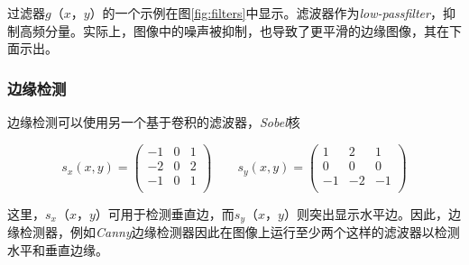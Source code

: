 
过滤器$g（x，y）$的一个示例在图\ref{fig:filters}中显示。滤波器作为\emph{low-passfilter}，抑制高频分量。实际上，图像中的噪声被抑制，也导致了更平滑的边缘图像，其在下面示出。



\subsubsection{边缘检测}
\label{sec:sobel}
边缘检测可以使用另一个基于卷积的滤波器，\emph{Sobel}核

\begin{equation}
s_x(x,y)=
\left(
\begin{array}{ccc}
-1 & 0 & 1\\
-2 & 0 & 2\\
-1 & 0 & 1\\
\end{array}
\right)
\qquad
s_y(x,y)=
\left(
\begin{array}{ccc}
1 & 2 & 1\\
0 & 0 & 0\\
-1 & -2 & -1\\
\end{array}
\right)
\end{equation}


这里，$s_x（x，y）$可用于检测垂直边，而$s_y（x，y）$则突出显示水平边。因此，边缘检测器，例如\emph{Canny}边缘检测器因此在图像上运行至少两个这样的滤波器以检测水平和垂直边缘。


